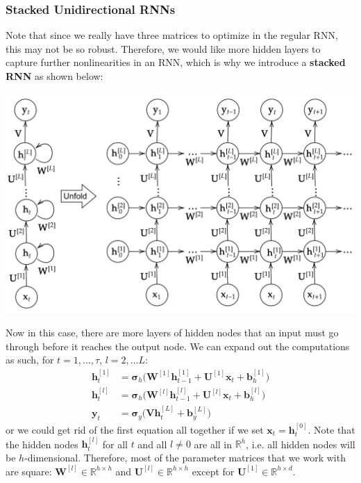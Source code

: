 \documentclass{article}
\theoremstyle{definition}
\theoremstyle{remark}
\theoremstyle{definition}
\begin{document}
\subsubsection{Stacked Unidirectional RNNs}

Note that since we really have three matrices to optimize in the regular RNN, this may not be so robust. Therefore, we would like more hidden layers to capture further nonlinearities in an RNN, which is why we introduce a \textbf{stacked RNN} as shown below: 
\begin{center}
    \includegraphics[scale=0.3]{Images/RNNs/Multilayer_RNN.png}
\end{center}
Now in this case, there are more layers of hidden nodes that an input must go through before it reaches the output node. We can expand out the computations as such, for $t = 1, \ldots, \tau$, $l = 2, \ldots L$: 
\begin{align*}
    \mathbf{h}_t^{[1]} & = \boldsymbol{\sigma}_h \big( \mathbf{W}^{[1]} \mathbf{h}_{t-1}^{[1]} + \mathbf{U}^{[1]} \mathbf{x}_t + \mathbf{b}_h^{[1]} \big) \\
    \mathbf{h}_t^{[l]} & = \boldsymbol{\sigma}_h \big( \mathbf{W}^{[l]} \mathbf{h}_{t-1}^{[l]} + \mathbf{U}^{[l]} \mathbf{x}_t + \mathbf{b}_h^{[l]} \big) \\
    \mathbf{y}_t & = \boldsymbol{\sigma}_y \big( \mathbf{V} \mathbf{h}_t^{[L]} + \mathbf{b}_y^{[L]} \big) 
\end{align*}
or we could get rid of the first equation all together if we set $\mathbf{x}_t = \mathbf{h}_t^{[0]}$. Note that the hidden nodes $\mathbf{h}^{[l]}_t$ for all $t$ and all $l \neq 0$ are all in $\mathbb{R}^h$, i.e. all hidden nodes will be $h$-dimensional. Therefore, most of the parameter matrices that we work with are square: $\mathbf{W}^{[l]} \in \mathbb{R}^{h \times h}$ and $\mathbf{U}^{[l]} \in \mathbb{R}^{h \times h}$ except for $\mathbf{U}^{[1]} \in \mathbb{R}^{h \times d}$. 
\end{document}
